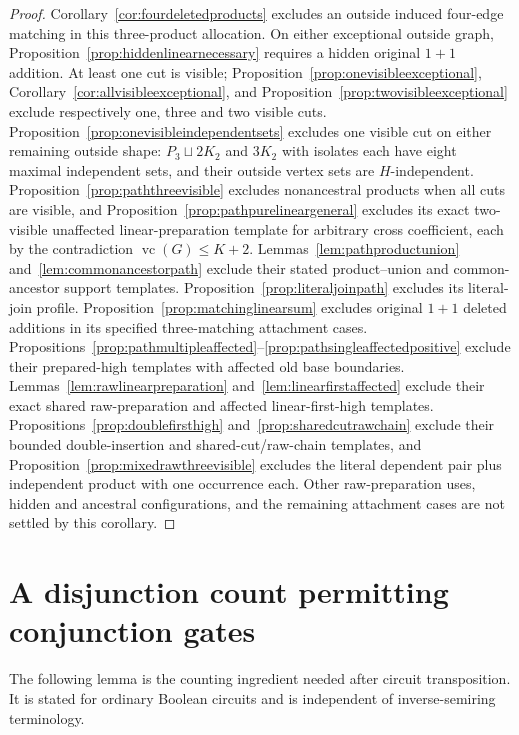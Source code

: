 \documentclass[11pt]{article}
\newcommand{\vc}{\operatorname{vc}}
\theoremstyle{definition}
\theoremstyle{remark}
\begin{document}
\begin{proof}
Corollary~\ref{cor:fourdeletedproducts} excludes an outside induced four-edge matching in this three-product allocation. On either exceptional outside graph, Proposition~\ref{prop:hiddenlinearnecessary} requires a hidden original $1+1$ addition. At least one cut is visible; Proposition~\ref{prop:onevisibleexceptional}, Corollary~\ref{cor:allvisibleexceptional}, and Proposition~\ref{prop:twovisibleexceptional} exclude respectively one, three and two visible cuts. Proposition~\ref{prop:onevisibleindependentsets} excludes one visible cut on either remaining outside shape: $P_3\sqcup2K_2$ and $3K_2$ with isolates each have eight maximal independent sets, and their outside vertex sets are $H$-independent. Proposition~\ref{prop:paththreevisible} excludes nonancestral products when all cuts are visible, and Proposition~\ref{prop:pathpurelineargeneral} excludes its exact two-visible unaffected linear-preparation template for arbitrary cross coefficient, each by the contradiction $\vc(G)\le K+2$. Lemmas~\ref{lem:pathproductunion} and~\ref{lem:commonancestorpath} exclude their stated product--union and common-ancestor support templates. Proposition~\ref{prop:literaljoinpath} excludes its literal-join profile. Proposition~\ref{prop:matchinglinearsum} excludes original $1+1$ deleted additions in its specified three-matching attachment cases. Propositions~\ref{prop:pathmultipleaffected}--\ref{prop:pathsingleaffectedpositive} exclude their prepared-high templates with affected old base boundaries. Lemmas~\ref{lem:rawlinearpreparation} and~\ref{lem:linearfirstaffected} exclude their exact shared raw-preparation and affected linear-first-high templates. Propositions~\ref{prop:doublefirsthigh} and~\ref{prop:sharedcutrawchain} exclude their bounded double-insertion and shared-cut/raw-chain templates, and Proposition~\ref{prop:mixedrawthreevisible} excludes the literal dependent pair plus independent product with one occurrence each. Other raw-preparation uses, hidden and ancestral configurations, and the remaining attachment cases are not settled by this corollary.
\end{proof}



\section{A disjunction count permitting conjunction gates}
The following lemma is the counting ingredient needed after circuit transposition. It is stated for ordinary Boolean circuits and is independent of inverse-semiring terminology.
\end{document}
